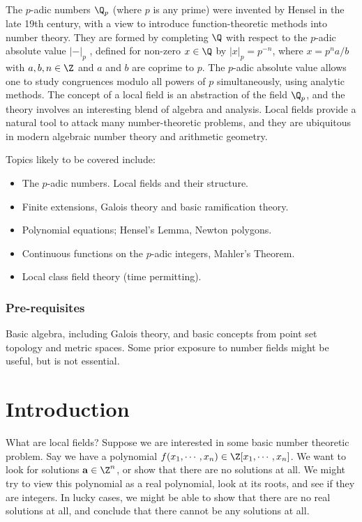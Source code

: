 \documentclass[a4paper]{article}
\begin{document}
\maketitle
{\small
\setlength{\parindent}{0em}
\setlength{\parskip}{1em}

The $p$-adic numbers $\Q_p$ (where $p$ is any prime) were invented by Hensel in the late 19th century, with a view to introduce function-theoretic methods into number theory. They are formed by completing $\Q$ with respect to the $p$-adic absolute value $|-|_p$ , defined for non-zero $x \in \Q$ by $|x|_p = p^{-n}$, where $x = p^n a/b$ with $a, b, n \in \Z$ and $a$ and $b$ are coprime to $p$. The $p$-adic absolute value allows one to study congruences modulo all powers of $p$ simultaneously, using analytic methods. The concept of a local field is an abstraction of the field $\Q_p$, and the theory involves an interesting blend of algebra and analysis. Local fields provide a natural tool to attack many number-theoretic problems, and they are ubiquitous in modern algebraic number theory and arithmetic geometry.

Topics likely to be covered include:
\begin{itemize}[label={}]
  \item The $p$-adic numbers. Local fields and their structure.
  \item Finite extensions, Galois theory and basic ramification theory.
  \item Polynomial equations; Hensel's Lemma, Newton polygons.
  \item Continuous functions on the $p$-adic integers, Mahler's Theorem.
  \item Local class field theory (time permitting).
\end{itemize}

\subsubsection*{Pre-requisites}
Basic algebra, including Galois theory, and basic concepts from point set topology and metric spaces. Some prior exposure to number fields might be useful, but is not essential.
}
\tableofcontents
\setcounter{section}{-1}
\section{Introduction}
What are local fields? Suppose we are interested in some basic number theoretic problem. Say we have a polynomial $f(x_1, \cdots, x_n) \in \Z[x_1, \cdots, x_n]$. We want to look for solutions $\mathbf{a} \in \Z^n$, or show that there are no solutions at all. We might try to view this polynomial as a real polynomial, look at its roots, and see if they are integers. In lucky cases, we might be able to show that there are no real solutions at all, and conclude that there cannot be any solutions at all.
\end{document}
